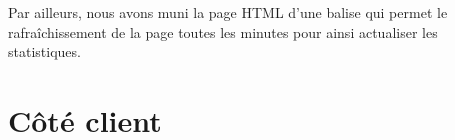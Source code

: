 \documentclass[a4paper, 11pt]{article}
\begin{document}
\bigskip Par ailleurs, nous avons muni la page HTML d’une balise qui
permet le rafraîchissement de la page toutes les minutes pour ainsi
actualiser les statistiques.

\section{Côté client}
\end{document}
